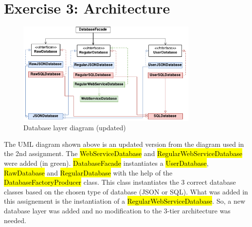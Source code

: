 \section{Exercise 3: Architecture}

\begin{figure}[h!]
    \caption{Database layer diagram (updated)}
    \centering
    \includegraphics[width=0.8\textwidth]{images/database.png}
\end{figure}

The UML diagram shown above is an updated version from the diagram used in the
2nd assignment. The \hl{WebServiceDatabase} and \hl{RegularWebServiceDatabase}
were added (in green). \hl{DatabaseFacade} instantiates a \hl{UserDatabase},
\hl{RawDatabase} and \hl{RegularDatabase} with the help of the
\hl{DatabaseFactoryProducer} class. This class instantiates the 3 correct
database classes based on the chosen type of database (JSON or SQL). What was
added in this assignement is the instantiation of a \hl{RegularWebServiceDatabase}.
So, a new database layer was added and no modification to the 3-tier architecture
was needed.

\newpage
